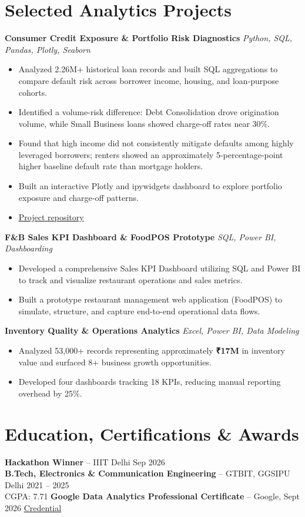 \documentclass[10pt,a4paper]{article}
\begin{document}
\section{Selected Analytics Projects}

\textbf{Consumer Credit Exposure \& Portfolio Risk Diagnostics}
\hfill \textit{Python, SQL, Pandas, Plotly, Seaborn}
\begin{itemize}
  \item Analyzed 2.26M+ historical loan records and built SQL aggregations to compare default risk across borrower income, housing, and loan-purpose cohorts.
  \item Identified a volume-risk difference: Debt Consolidation drove origination volume, while Small Business loans showed charge-off rates near 30\%.
  \item Found that high income did not consistently mitigate defaults among highly leveraged borrowers; renters showed an approximately 5-percentage-point higher baseline default rate than mortgage holders.
  \item Built an interactive Plotly and ipywidgets dashboard to explore portfolio exposure and charge-off patterns.
  \item \href{https://github.com/GauravRoy092/credit_portfolio_exposure}{Project repository}
\end{itemize}

\textbf{F\&B Sales KPI Dashboard \& FoodPOS Prototype}
\hfill \textit{SQL, Power BI, Dashboarding}
\begin{itemize}
  \item Developed a comprehensive Sales KPI Dashboard utilizing SQL and Power BI to track and visualize restaurant operations and sales metrics.
  \item Built a prototype restaurant management web application (FoodPOS) to simulate, structure, and capture end-to-end operational data flows.
\end{itemize}

\textbf{Inventory Quality \& Operations Analytics}
\hfill \textit{Excel, Power BI, Data Modeling}
\begin{itemize}
  \item Analyzed 53,000+ records representing approximately \textbf{₹17M} in inventory value and surfaced 8+ business growth opportunities.
  \item Developed four dashboards tracking 18 KPIs, reducing manual reporting overhead by 25\%.
\end{itemize}

\section{Education, Certifications \& Awards}
\textbf{Hackathon Winner} -- IIIT Delhi \hfill Sep 2026\\
\textbf{B.Tech, Electronics \& Communication Engineering} -- GTBIT, GGSIPU Delhi
\hfill 2021 -- 2025\\
CGPA: 7.71
\hfill
\textbf{Google Data Analytics Professional Certificate} -- Google, Sept 2026
\textbar{} \href{https://drive.google.com/file/d/14Zjb03LreuKHPV159e3-3ucDxii6RKds/view?usp=sharing}{Credential}
\end{document}
